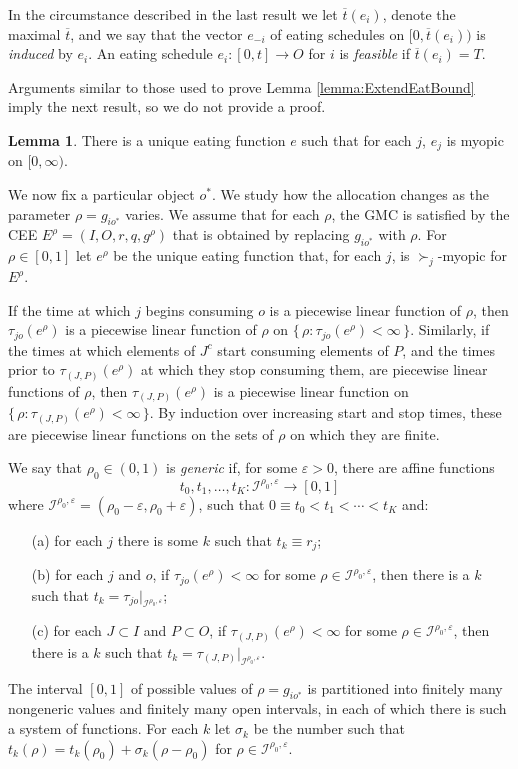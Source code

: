 \documentclass[12pt, A4paper]{article}
\theoremstyle{definition}
\newtheorem{lem}{Lemma}
\newcommand{\cI}{\mathcal{I}}
\newcommand{\bart}{{\overline t}}
\newcommand{\varep}{\varepsilon}
\begin{document}
\begin{appendix}
In the circumstance described in the last result we let $\bart(e_i)$, denote the maximal $\bart$, and we say that the vector $e_{-i}$ of eating schedules on $[0,\bart(e_i))$ is \emph{induced} by $e_i$.  An eating schedule $e_i \colon [0,t] \to O$ for $i$ is \emph{feasible} if $\bart(e_i) = T$.

Arguments similar to those used to prove Lemma \ref{lemma:ExtendEatBound} imply the next result, so we do not provide a proof.

\begin{lem} \label{lemma:ExtendEat}
  There is a unique eating function $e$ such that for each $j$, $e_j$ is myopic on $[0,\infty)$.
\end{lem}

We now fix a particular object $o^*$.  
We study how the allocation changes as  the parameter $\rho = g_{io^*}$ varies.  
We assume that for each $\rho$, the GMC is satisfied by the CEE $E^\rho = (I,O,r,q,g^\rho)$ that is obtained by replacing $g_{io^*}$ with $\rho$.
For $\rho \in [0,1]$ let $e^\rho$ be the unique eating function that, for each $j$, is $\succ_j$-myopic for $E^\rho$.

If the time at which $j$ begins consuming $o$ is a piecewise linear function of $\rho$, then $\tau_{jo}(e^\rho)$ is a piecewise linear function of $\rho$ on $\{\, \rho : \tau_{jo}(e^\rho) < \infty \,\}$.  Similarly, if the times at which elements of $J^c$ start consuming elements of $P$, and the times prior to $\tau_{(J,P)}(e^\rho)$ at which they stop consuming them, are piecewise linear functions of $\rho$, then $\tau_{(J,P)}(e^\rho)$ is a piecewise linear function on $\{\, \rho : \tau_{(J,P)}(e^\rho) < \infty \,\}$.  By induction over increasing start and stop times, these are piecewise linear functions on the sets of $\rho$ on which they are finite.

We say that $\rho_0 \in (0,1)$ is \emph{generic} if, for some $\varep > 0$, there are  affine functions $$t_0, t_1, \ldots, t_K \colon \cI^{\rho_0,\varep} \to [0,1]$$ where $\cI^{\rho_0,\varep} = (\rho_0 - \varep,\rho_0 + \varep)$, such that $0 \equiv t_0 < t_1 < \cdots < t_K$ and:
\begin{enumerate}
  \item[(a)] for each $j$ there is some $k$ such that $t_k \equiv r_j$;
  \item[(b)] for each $j$ and $o$, if $\tau_{jo}(e^\rho) < \infty$ for some $\rho \in \cI^{\rho_0,\varep}$, then there is a $k$ such that $t_k = \tau_{{jo}}|_{\cI^{\rho_0,\varep}}$;
  \item[(c)]  for each $J \subset I$ and $P \subset O$, if $\tau_{(J,P)}(e^\rho) < \infty$ for some $\rho \in \cI^{\rho_0,\varep}$, then there is a $k$ such that $t_k = \tau_{(J,P)}|_{\cI^{\rho_0,\varep}}$.
\end{enumerate}
The interval $[0,1]$ of possible values of $\rho = g_{io^*}$ is partitioned into finitely many nongeneric values and finitely many open intervals, in each of which there is such a system of functions.  For each $k$ let $\sigma_k$ be the number such that 
$t_k(\rho) = t_k(\rho_0) + \sigma_k(\rho - \rho_0)$ for $\rho \in \cI^{\rho_0,\varep}$.


\end{appendix}
\end{document}
